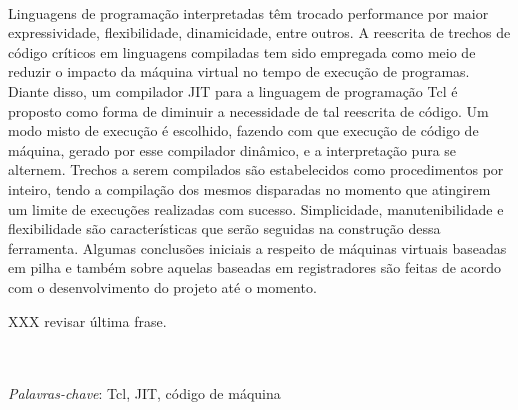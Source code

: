 \\
Linguagens de programação interpretadas têm trocado performance por
maior expressividade, flexibilidade, dinamicidade, entre outros.
A reescrita de trechos de código críticos em linguagens compiladas tem
sido empregada como meio de reduzir o impacto da máquina virtual no
tempo de execução de programas. Diante disso, um compilador JIT para a
linguagem de programação Tcl é proposto como forma de diminuir a
necessidade de tal reescrita de código. Um modo misto de execução é
escolhido, fazendo com que execução de código de máquina, gerado por
esse compilador dinâmico, e a interpretação pura se
alternem.
Trechos a serem compilados são estabelecidos como procedimentos por
inteiro, tendo a compilação dos mesmos disparadas no momento que atingirem
um limite de execuções realizadas com sucesso.
Simplicidade, manutenibilidade e flexibilidade são
características que serão seguidas na construção dessa ferramenta.
Algumas conclusões iniciais a respeito de máquinas virtuais baseadas
em pilha e também sobre aquelas baseadas em registradores são feitas
de acordo com o desenvolvimento do projeto até o momento.

XXX revisar última frase.

\quad\\
\quad\\
\textit{Palavras-chave}: Tcl, JIT, código de máquina
